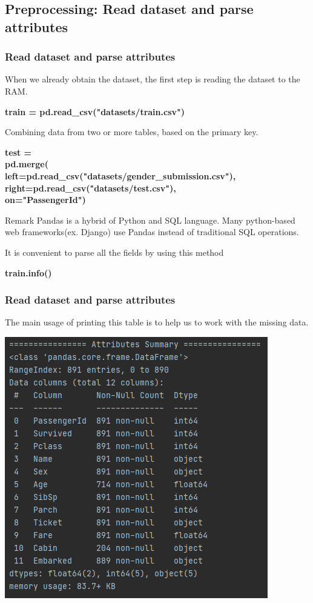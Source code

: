 \documentclass{beamer}
\begin{document}
\subsection{Preprocessing: Read dataset and parse attributes}
\begin{frame}
	\frametitle{Read dataset and parse attributes}
	\begin{flushleft}
		When we already obtain the dataset, the first step is reading the dataset to the RAM.
	\end{flushleft}
	\begin{center}
		\textbf{\color{blue}\footnotesize train = pd.read\_csv("datasets/train.csv")}
	\end{center}
	\begin{flushleft}
		Combining data from two or more tables, based on the primary key.
	\end{flushleft}
	\begin{center}
		\textbf{\color{blue} \footnotesize
			test = pd.merge(~~~~~~~~~~~~~~~~~~~~~~~~~~~~~~~~~~~~~~~~~~~~~~~~~~~ \\
			left=pd.read\_csv("datasets/gender\_submission.csv"), \\
			right=pd.read\_csv("datasets/test.csv"),~~~~~~~~~~~~~~~~~ \\
			on="PassengerId")~~~~~~~~~~~~~~~~~~~~~~~~~~~~~~~~~~~~~~~~~ 
		}
	\end{center}
	\begin{block}{Remark}
	Pandas is a hybrid of Python and SQL language. Many python-based web frameworks(ex. Django) use Pandas instead of traditional SQL operations.
	\end{block}
	\begin{flushleft}
		It is convenient to parse all the fields by using this method
	\end{flushleft}
	\begin{center}
		\textbf{\color{blue}\footnotesize train.info()}
	\end{center}
\end{frame}

\begin{frame}
	\frametitle{Read dataset and parse attributes}
	\begin{flushleft}
		The main usage of printing this table is to help us to work with the missing data.
	\end{flushleft}
	\begin{center}
		\includegraphics[width=0.55\linewidth]{./src/figures/1.png}
	\end{center}
\end{frame}
\end{document}
